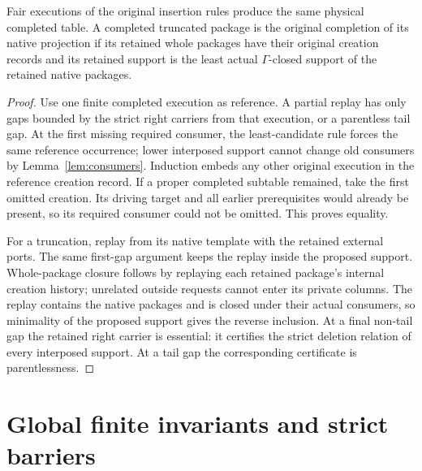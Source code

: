 \begin{lemma}\label{lem:replay}
Fair executions of the original insertion rules produce the same
physical completed table. A completed truncated package is the original
completion of its native projection if its retained whole packages have
their original creation records and its retained support is the least
actual $\Gamma$-closed support of the retained native packages.
\end{lemma}
\begin{proof}
Use one finite completed execution as reference. A partial replay has
only gaps bounded by the strict right carriers from that execution, or
a parentless tail gap. At the first missing required consumer, the
least-candidate rule forces the same reference occurrence; lower
interposed support cannot change old consumers by
Lemma~\ref{lem:consumers}. Induction embeds any other original execution
in the reference creation record. If a proper completed subtable
remained, take the first omitted creation. Its driving target and all
earlier prerequisites would already be present, so its required
consumer could not be omitted. This proves equality.

For a truncation, replay from its native template with the retained
external ports. The same first-gap argument keeps the replay inside
the proposed support. Whole-package closure follows by replaying each
retained package's internal creation history; unrelated outside
requests cannot enter its private columns. The replay contains the
native packages and is closed under their actual consumers, so
minimality of the proposed support gives the reverse inclusion.
At a final non-tail gap the retained right carrier is essential: it
certifies the strict deletion relation of every interposed support.
At a tail gap the corresponding certificate is parentlessness.
\end{proof}

\section{Global finite invariants and strict barriers}\label{ch:syntax}

